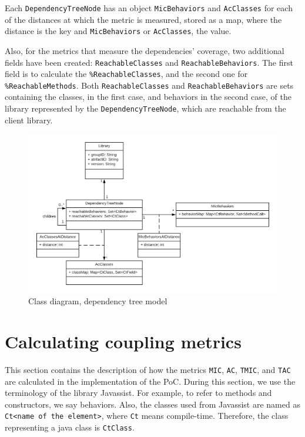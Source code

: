 Each \texttt{DependencyTreeNode} has an object \texttt{MicBehaviors} and \texttt{AcClasses} for each of the distances at which the metric is measured, stored as a map, where the distance is the key and \texttt{MicBehaviors} or \texttt{AcClasses}, the value.

Also, for the metrics that measure the dependencies' coverage, two additional fields have been created: \texttt{ReachableClasses} and \texttt{ReachableBehaviors}. The first field is to calculate the \texttt{\%ReachableClasses}, and the second one for \texttt{\%ReachableMethods}. Both \texttt{ReachableClasses} and \texttt{ReachableBehaviors} are sets containing the classes, in the first case, and behaviors in the second case, of the library represented by the \texttt{DependencyTreeNode}, which are reachable from the client library.

\begin{figure}[ht]
\begin{center}
\includegraphics[width=\textwidth]{figures/Thesis-ModelClassDiagram.png}
\caption{Class diagram, dependency tree model}
\label{fig:class-diagram-tree}
\end{center}
\end{figure}


\section{Calculating coupling metrics}
This section contains the description of how the metrics \texttt{MIC}, \texttt{AC}, \texttt{TMIC}, and \texttt{TAC} are calculated in the implementation of the PoC. During this section, we use the terminology of the library Javassist. For example, to refer to methods and constructors, we say behaviors. Also, the classes used from Javassist are named as \texttt{Ct<name of the element>}, where \texttt{Ct} means compile-time. Therefore, the class representing a java class is \texttt{CtClass}.

